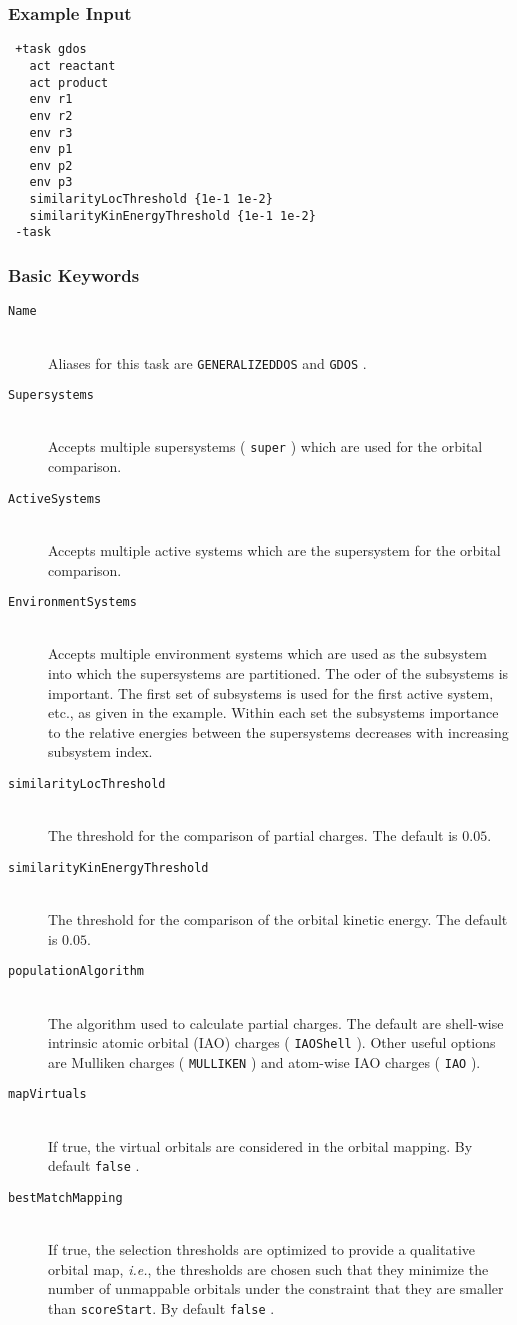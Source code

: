 \documentclass[bibliography=totocnumbered,a4paper,10pt,oneside]{scrbook}
\newcommand{\ttt}[1]{%
  \begingroup\setlength{\fboxsep}{1pt}%
  \colorbox{serenity-green!30}{\texttt{\hspace*{2pt}\vphantom{(g}#1\hspace*{2pt}}}%
  \endgroup
}
\begin{document}
\subsubsection{Example Input}
\begin{lstlisting}
 +task gdos
   act reactant
   act product
   env r1
   env r2
   env r3
   env p1
   env p2
   env p3
   similarityLocThreshold {1e-1 1e-2}
   similarityKinEnergyThreshold {1e-1 1e-2}
 -task
\end{lstlisting}
\subsubsection{Basic Keywords}
\begin{description}
 \item [\texttt{Name}]\hfill \\
 Aliases for this task are \ttt{GENERALIZEDDOS} and \ttt{GDOS}.
 \item [\texttt{Supersystems}]\hfill \\
 Accepts multiple supersystems (\ttt{super}) which are used for the orbital comparison.
 \item [\texttt{ActiveSystems}]\hfill \\
 Accepts multiple active systems which are the supersystem for the orbital comparison.
 \item [\texttt{EnvironmentSystems}]\hfill \\
 Accepts multiple environment systems which are used as the subsystem into which the
 supersystems are partitioned. The oder of the subsystems is important. The
 first set of subsystems is used for the first active system, etc., as given in the
 example. Within each set the subsystems importance to the relative energies between
 the supersystems decreases with increasing subsystem index.
 \item [\texttt{similarityLocThreshold}]\hfill \\
 The threshold for the comparison of partial charges. The default is ${0.05}$.
 \item [\texttt{similarityKinEnergyThreshold}]\hfill \\
 The threshold for the comparison of the orbital kinetic energy. The default is ${0.05}$.
 \item [\texttt{populationAlgorithm}]\hfill \\
 The algorithm used to calculate partial charges. The default are shell-wise intrinsic atomic orbital (IAO)
 charges (\ttt{IAOShell}). Other useful options are Mulliken charges (\ttt{MULLIKEN}) and atom-wise IAO
 charges (\ttt{IAO}).
 \item [\texttt{mapVirtuals}]\hfill \\
 If true, the virtual orbitals are considered in the orbital mapping. By default \ttt{false}.
 \item [\texttt{bestMatchMapping}]\hfill \\
 If true, the selection thresholds are optimized to provide a qualitative orbital map, \emph{i.e.},
 the thresholds are chosen such that they minimize the number of unmappable orbitals
 under the constraint that they are smaller than \texttt{scoreStart}. By default \ttt{false}.
\end{description}
\end{document}
